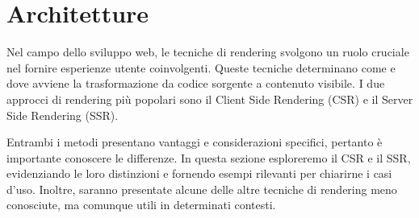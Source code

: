 \chapter{Architetture}
Nel campo dello sviluppo web, le tecniche di rendering svolgono un ruolo cruciale nel fornire esperienze utente
coinvolgenti. Queste tecniche determinano come e dove avviene la trasformazione da codice sorgente a contenuto visibile.
I due approcci di rendering più popolari sono il Client Side Rendering (CSR) e il Server Side Rendering
(SSR). 

Entrambi i metodi presentano vantaggi e considerazioni specifici, pertanto è importante conoscere le differenze.
In questa sezione esploreremo il CSR e il SSR, evidenziando le loro distinzioni e fornendo esempi rilevanti per
chiarirne i casi d'uso. Inoltre, saranno presentate alcune delle altre tecniche di rendering meno conosciute, ma
comunque utili in determinati contesti.





